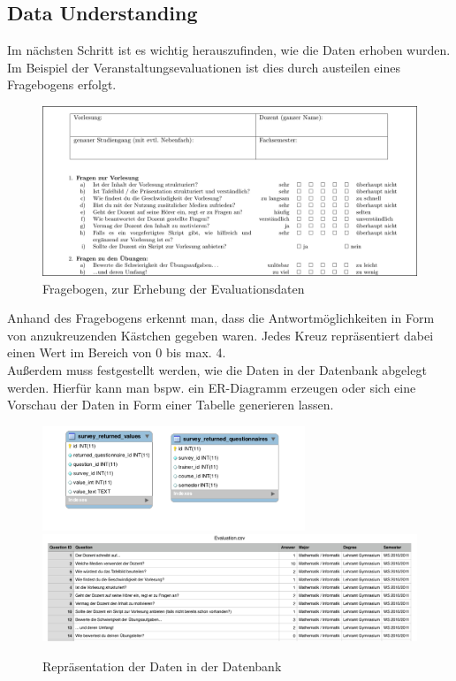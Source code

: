 \subsection{Data Understanding}
\label{sec:example:data:du}

Im nächsten Schritt ist es wichtig herauszufinden, wie die Daten erhoben wurden.
Im Beispiel der Veranstaltungsevaluationen ist dies durch austeilen eines
Fragebogens erfolgt.

\begin{figure}[htb]
	\includegraphics[width=\textwidth]{gfx/questionnaire.png}
	\caption{Fragebogen, zur Erhebung der Evaluationsdaten}
	\label{fig:example:data:du:qu}
\end{figure}

Anhand des Fragebogens erkennt man, dass die Antwortmöglichkeiten in Form von
anzukreuzenden Kästchen gegeben waren. Jedes Kreuz repräsentiert dabei einen
Wert im Bereich von 0 bis max. 4. \\
Außerdem muss festgestellt werden, wie die Daten in der Datenbank abgelegt
werden. Hierfür kann man bspw. ein ER-Diagramm erzeugen oder sich eine Vorschau
der Daten in Form einer Tabelle generieren lassen.

\begin{figure}[htb]
  \center
	\includegraphics[width=0.7\textwidth]{gfx/db1.png}
  \includegraphics[width=\textwidth]{gfx/db2.png}
	\caption{Repräsentation der Daten in der Datenbank}
	\label{fig:example:data:du:db}
\end{figure}

